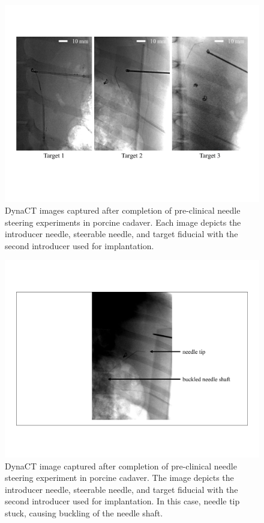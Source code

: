 \begin{figure}[!t]
\centering
\includegraphics[width = \columnwidth]{./Images/Chapter5/TargetsCT/TargetsCT.pdf}%
\caption[DynaCT images captured after pre-clinical experiments]{DynaCT images captured after completion of pre-clinical needle steering experiments in porcine cadaver. Each image depicts the introducer needle, steerable needle, and target fiducial with the second introducer used for implantation.}
\label{fig:CadaverTargetsCT}
\end{figure} 

\begin{figure}[!t]
\centering
\includegraphics[width = \columnwidth]{./Images/Chapter5/TargetsCT/FailedTargetsCT.pdf}%
\caption[DynaCT images captured after failed pre-clinical experiment]{DynaCT image captured after completion of pre-clinical needle steering experiment in porcine cadaver. The image depicts the introducer needle, steerable needle, and target fiducial with the second introducer used for implantation. In this case, needle tip stuck, causing buckling of the needle shaft.}
\label{fig:FailedCadaverTargetsCT}
\end{figure} 

